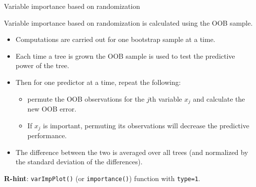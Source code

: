 \documentclass[
  10pt,
  ignorenonframetext,
]{beamer}
\providecommand{\tightlist}{%
  \setlength{\itemsep}{0pt}\setlength{\parskip}{0pt}}
\begin{document}
\begin{frame}[fragile]
\begin{block}{Variable importance based on randomization}
\protect\hypertarget{variable-importance-based-on-randomization}{}
\vspace{2mm}

Variable importance based on randomization is calculated using the OOB
sample. \vspace{1mm}

\begin{itemize}
\tightlist
\item
  Computations are carried out for one bootstrap sample at a time.
\item
  Each time a tree is grown the OOB sample is used to test the
  predictive power of the tree.
\item
  Then for one predictor at a time, repeat the following:

  \begin{itemize}
  \tightlist
  \item
    permute the OOB observations for the \(j\)th variable \(x_j\) and
    calculate the new OOB error.
  \item
    If \(x_j\) is important, permuting its observations will decrease
    the predictive performance.
  \end{itemize}
\item
  The difference between the two is averaged over all trees (and
  normalized by the standard deviation of the differences).
\end{itemize}

\vspace{4mm}

\textbf{R-hint}: \texttt{varImpPlot()} (or \texttt{importance()})
function with \texttt{type=1}.
\end{block}
\end{frame}
\end{document}
